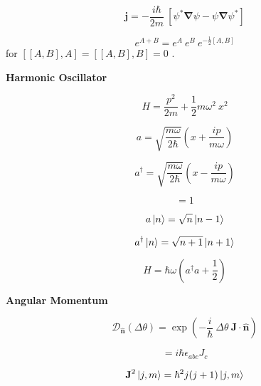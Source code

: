 \documentclass[11pt]{article}
\newcommand{\CurD}{\mathcal{D}}
\newcommand{\vect}[1]{\boldsymbol{\mathbf{#1}}}
\begin{document}
\begin{multicols}{2}
\begin{equation}
\vect{j} = - \frac{i \hbar}{2m} \: [\psi^* \vect{\nabla} \psi - \psi \vect{\nabla} \psi^*]
\end{equation}

\begin{equation}
e^{A+B}=e^A \: e^B \: e^{-\frac{1}{2}[A,B]}
\end{equation}
{\footnotesize for \( [[A,B],A]=[[A,B],B]=0 \) .}

\columnbreak

{\bf Harmonic Oscillator}

\begin{equation}
H = \frac{p^2}{2m} + \frac{1}{2} m \omega^2 \: x^2
\end{equation}

\begin{equation}
a = \sqrt{\frac{m\omega}{2\hbar}} \left( x+\frac{ip}{m\omega} \right)
\end{equation}

\begin{equation}
a^{\dagger} = \sqrt{\frac{m\omega}{2\hbar}} \left( x-\frac{ip}{m\omega} \right)
\end{equation}

\begin{equation}
[\:a, a^{\dagger}] = 1
\end{equation}

\begin{equation}
a \ket{n} = \sqrt{n} \ket{n-1}
\end{equation}

\begin{equation}
a^{\dagger} \ket{n} = \sqrt{n+1} \ket{n+1}
\end{equation}

\begin{equation}
H = \hbar\omega(a^{\dagger}a+\frac{1}{2})
\end{equation}

{\bf Angular Momentum}

\begin{equation}
\CurD_{\vect{\hat{n}}} (\Delta \theta )
  = \exp \left(-\frac{i}{\hbar} \: \Delta \theta \:
               \vect{J} \cdot \vect{\hat{n}} \right )
\end{equation}

\begin{equation}
[J_a,J_b] = i \hbar \epsilon_{abc} J_c
\end{equation}

\begin{equation}
\vect{J}^2 \ket{j,m} = \hbar^2 j (j+1) \ket{j,m}
\end{equation}


\end{multicols}
\end{document}
